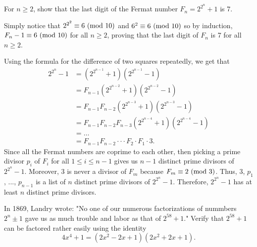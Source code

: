 \begin{exercise}
    For $n \geq 2$, show that the last digit of the Fermat number $F_n = 2^{2^n} + 1$ is 7.  \\
\end{exercise}

\begin{solution}
    Simply notice that $2^{2^2} \equiv 6 \ (\mathrm{mod}\ 10)$ and $6^2 \equiv 6 \ (\mathrm{mod}\ 10)$ so by induction, $F_n - 1 \equiv 6 \ (\mathrm{mod}\ 10)$ for all $n \geq 2$, proving that the last digit of $F_n$ is 7 for all $n \geq 2$. \\
\end{solution}


\begin{solution}
    Using the formula for the difference of two squares repeatedly, we get that
    \begin{align*}
        2^{2^n} - 1 &= (2^{2^{n-1}} + 1)(2^{2^{n-1}} - 1) \\
        &= F_{n-1}(2^{2^{n-2}} + 1)(2^{2^{n-2}} - 1) \\
        &= F_{n-1}F_{n-2}(2^{2^{n-3}} + 1)(2^{2^{n-3}} - 1) \\
        &= F_{n-1}F_{n-2}F_{n-3}(2^{2^{n-4}} + 1)(2^{2^{n-4}} - 1) \\
        &= \dots \\
        &= F_{n-1}F_{n-2}\cdot \cdot \cdot F_2\cdot F_1 \cdot 3.
    \end{align*}
    Since all the Fermat numbers are coprime to each other, then picking a prime divisor $p_i$ of $F_{i}$ for all $1 \leq i \leq n-1$ gives us $n-1$ distinct prime divisors of $2^{2^n} - 1$. Moreover, 3 is never a divisor of $F_m$ because $F_m \equiv 2 \ (\mathrm{mod}\ 3)$. Thus, 3, $p_1$, ..., $p_{n-1}$ is a list of $n$ distinct prime divisors of $2^{2^n} - 1$. Therefore, $2^{2^n} - 1$ has at least $n$ distinct prime divisors. \\
\end{solution}

\begin{exercise}
    In 1869, Landry wrote: "No one of our numerous factorizations of nummbers $2^n \pm 1$ gave us as much trouble and labor as that of $2^{58} + 1$." Verify that $2^{58} + 1$ can be factored rather easily using the identity
    $$4x^4 + 1 = (2x^2 - 2x + 1)(2x^2 + 2x + 1).$$ \\
\end{exercise}

